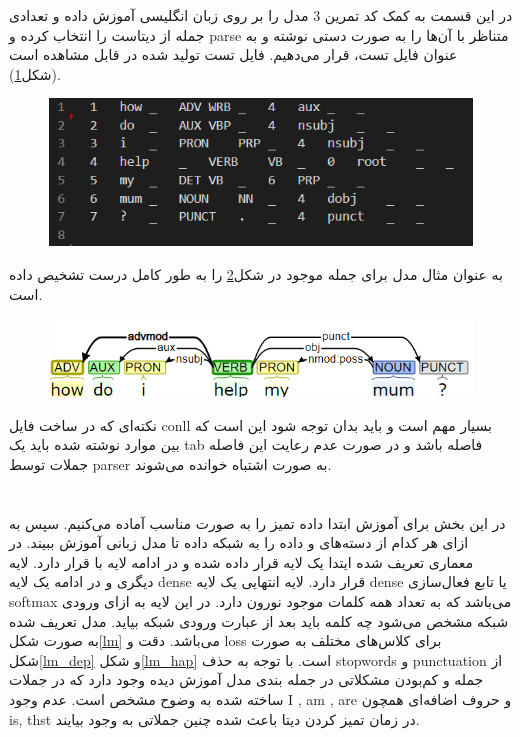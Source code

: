 \documentclass[10pt]{article}
\begin{document}
در این قسمت به کمک کد تمرین 3 مدل
را بر روی زبان انگلیسی آموزش داده و تعدادی جمله از دیتاست را انتخاب کرده و parse متناظر با آن‌ها را به صورت دستی نوشته و به عنوان فایل تست، قرار می‌دهیم. فایل تست تولید شده در 
قابل مشاهده است (شکل\ref{dep_parser_test}).
\begin{figure}[ht!]
	\centering\includegraphics[width=\linewidth]{../reports/dep_parser_test.png}
	\caption{
		}
	\label{dep_parser_test}
\end{figure}

به عنوان مثال مدل برای جمله موجود در شکل\ref{dep_parser} 
را به طور کامل درست تشخیص داده است.
\begin{figure}[ht!]
	\centering\includegraphics[width=\linewidth]{../reports/dep_parser_1.png}
	\caption{
		}
	\label{dep_parser}
\end{figure}

نکته‌‌ای که در ساخت فایل conll بسیار مهم است و باید بدان توجه شود این است که بین موارد نوشته شده باید یک tab فاصله باشد و در صورت عدم رعایت این فاصله جملات توسط parser به صورت اشتباه خوانده می‌شوند.
\newpage
\section{
	}
	در این بخش برای آموزش 
	ابتدا داده تمیز را به صورت مناسب آماده می‌کنیم. سپس به ازای هر کدام از دسته‌های 
	و
	داده را به شبکه داده تا مدل زبانی آموزش ببیند. در معماری تعریف شده ایتدا یک لایه 
	قرار داده شده و در ادامه لایه 
	با 
	قرار دارد. لایه دیگری
	و در ادامه یک لایه dense قرار دارد. لایه انتهایی یک لایه dense یا تابع فعال‌سازی softmax می‌باشد که به تعداد همه کلمات موجود نورون دارد. در این لایه به ازای ورودی شبکه مشخص می‌شود چه کلمه باید بعد از عبارت ورودی شبکه بیاید.
	مدل تعریف شده به صورت شکل\ref{lm}
	می‌باشد. دقت و loss برای کلاس‌های مختلف به صورت شکل\ref{lm_dep} و شکل\ref{lm_hap} است. با توجه به حذف stopwords و punctuation از جمله و کم‌بودن مشکلاتی در جمله بندی مدل آموزش دیده وجود دارد که در جملات ساخته شده به وضوح مشخص است. عدم وجود I , am , are و حروف اضافه‌ای همچون is, thst در زمان تمیز کردن دیتا باعث شده چنین جملاتی به وجود بیایند.
	
\end{document}
